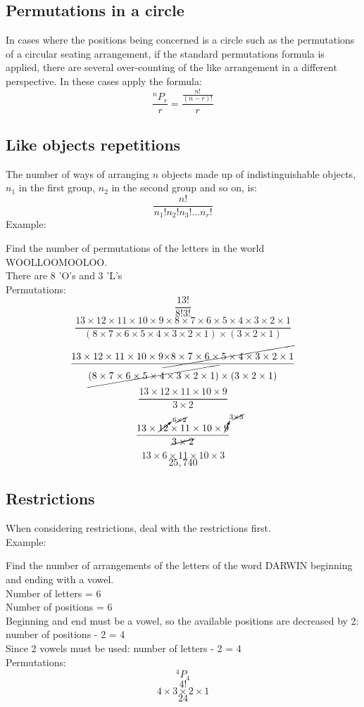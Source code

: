 \documentclass[a4paper,10pt]{report}
\begin{document}
\subsection{Permutations in a circle}
In cases where the positions being concerned is a circle such as the permutations of a circular seating arrangement, if the standard permutations formula is applied, there are several over-counting of the like arrangement in a different perspective.  In these cases apply the formula:
$$
	\frac{^nP_r}{r} = \frac{\frac{n!}{(n-r)!}}{r}
$$

\subsection{Like objects repetitions}
The number of ways of arranging $n$ objects made up of indistinguishable objects, $n_1$ in the first group, $n_2$ in the second group and so on, is:
$$
	\frac{n!}{n_1! n_2! n_3!... n_r!}
$$
Example:\\
\begin{center}
	Find the number of permutations of the letters in the world WOOLLOOMOOLOO.\\
	There are 8 'O's and 3 'L's\\
	Permutations:
	$$\frac{13!}{8!3!}$$
	$$\frac{13 \times 12 \times 11 \times 10 \times 9 \times 8 \times 7 \times 6 \times 5 \times 4 \times 3 \times 2 \times 1}{(8 \times 7 \times 6 \times 5 \times 4 \times 3 \times 2 \times 1) \times (3 \times 2 \times 1)}$$
	$$\frac{13 \times 12 \times 11 \times 10 \times 9 \cancel{\times 8 \times 7 \times 6 \times 5 \times 4 \times 3 \times 2 \times 1}}{\cancel{(8 \times 7 \times 6 \times 5 \times 4 \times 3 \times 2 \times 1)} \times (3 \times 2 \times 1)}$$
	$$\frac{13 \times 12 \times 11 \times 10 \times 9}{3 \times 2}$$
	$$\frac{13 \times \cancelto{6 \cancel{\times 2}}{12} \times 11 \times 10 \times \cancelto{3 \cancel{\times 3}}{9}}{\cancel{3 \times 2}}$$
	$$13 \times 6 \times 11 \times 10 \times 3$$
	$$25,740$$
\end{center}

\subsection{Restrictions}
When considering restrictions, deal with the restrictions first.\\
Example:\\
\begin{center}
	Find the number of arrangements of the letters of the word DARWIN beginning and ending with a vowel.\\
	Number of letters = 6\\
	Number of positions = 6\\
	Beginning and end must be a vowel, so the available positions are decreased by 2: number of positions - 2 = 4\\
	Since 2 vowels must be used:  number of letters - 2 = 4\\
	Permutations:
	$$^4P_4$$
	$$4!$$
	$$4 \times 3 \times 2 \times 1$$
	$$24$$
\end{center}
\end{document}
